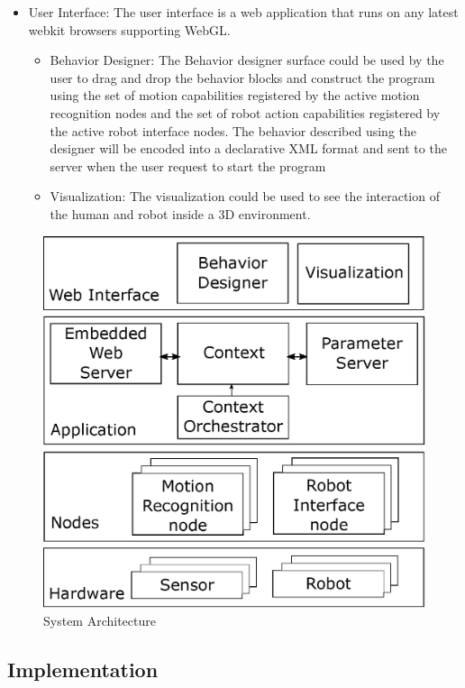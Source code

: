 \documentclass{llncs}
\begin{document}
\begin{itemize}
\begin{itemize}
\end{itemize}
\item User Interface: The user interface is a web application that runs on any latest webkit browsers supporting WebGL. 
\begin{itemize}
\item Behavior Designer: The Behavior designer surface could be used by the user to drag and drop the behavior blocks and construct the program using the set of motion capabilities registered by the active motion recognition nodes and the set of robot action capabilities registered by the active robot interface nodes. The behavior described using the designer will be encoded into a declarative XML format and sent to the server when the user request to start the program
\item Visualization: The visualization could be used to see the interaction of the human and robot inside a 3D environment.
\end{itemize}
\end{itemize}
\begin{figure}
\centering
\includegraphics[width=1\textwidth]{../thesis/assets/architecture.eps}
\caption[System Architecture]{System Architecture}
\label{fig:architecture}
\end{figure}
%
\subsection{Implementation}
%
%
\end{document}
